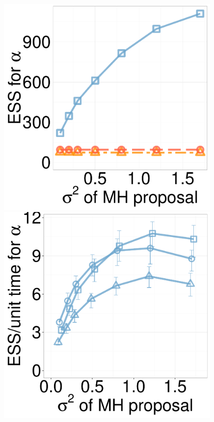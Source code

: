 \begin{figure}
\begin{minipage}[!hp]{0.24\linewidth}
  \end{minipage}
  \begin{minipage}[!hp]{0.24\linewidth}
	\centering
    \includegraphics[width=0.99\textwidth, angle=0]{figs/ess/JCalpha_k2.pdf}
\end{minipage}
  \begin{minipage}[!hp]{0.24\linewidth}
	\centering
    \includegraphics[width=0.99\textwidth, angle=0]{figs/new_whole_exp_figs/mh_jc_alpha.pdf}

\end{minipage}
\end{figure}
